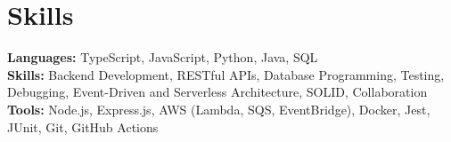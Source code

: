 \documentclass[11pt]{article}
\begin{document}
\vspace{-18.5pt}

\section*{Skills}
\textbf{Languages:} TypeScript, JavaScript, Python, Java, SQL\\
\textbf{Skills:} Backend Development, RESTful APIs, Database Programming, Testing, Debugging, Event-Driven and Serverless Architecture, SOLID, Collaboration\\
\textbf{Tools:} Node.js, Express.js, AWS (Lambda, SQS, EventBridge), Docker, Jest, JUnit, Git, GitHub Actions

\vspace{-6.5pt}
\end{document}
